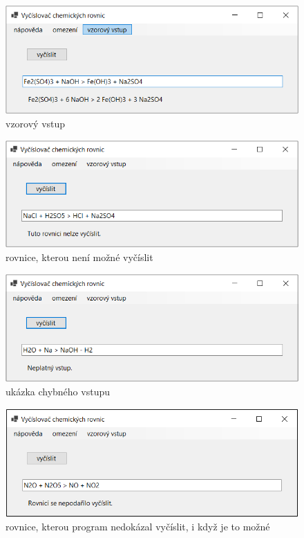 \documentclass[12pt,a4paper]{report}
\begin{document}
\begin{figure}[h]
	\centering
	\includegraphics{vzorovy_vstup}
	\caption{vzorový vstup}
\end{figure}
\begin{figure}[h]
	\centering
	\includegraphics{nevycislitelna_rovnice}
	\caption{rovnice, kterou není možné vyčíslit}
\end{figure}
\begin{figure}[h]
	\centering
	\includegraphics{chybny_vstup}
	\caption{ukázka chybného vstupu}
\end{figure}
\begin{figure}[h]
\centering
\includegraphics{nezvladnuta_rovnice}
\caption{rovnice, kterou program nedokázal vyčíslit, i když je to možné}
\end{figure}

\openright
\end{document}
